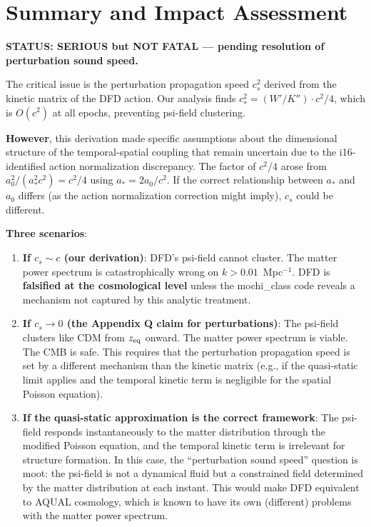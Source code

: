 \documentclass[11pt]{article}
\begin{document}
\section*{Summary and Impact Assessment}

\begin{tcolorbox}[colback=red!10!white, colframe=red!70!black,
  title=\textbf{EXISTENTIAL ASSESSMENT}]

\textbf{STATUS: SERIOUS but NOT FATAL --- pending resolution of
perturbation sound speed.}

The critical issue is the perturbation propagation speed $c_s^2$
derived from the kinetic matrix of the DFD action. Our analysis
finds $c_s^2 = (W'/K'') \cdot c^2/4$, which is $O(c^2)$ at
all epochs, preventing psi-field clustering.

\textbf{However}, this derivation made specific assumptions about the
dimensional structure of the temporal-spatial coupling that remain
uncertain due to the i16-identified action normalization discrepancy.
The factor of $c^2/4$ arose from $a_0^2/(a_*^2 c^2) = c^2/4$ using
$a_* = 2a_0/c^2$. If the correct relationship between $a_*$ and
$a_0$ differs (as the action normalization correction might imply),
$c_s$ could be different.

\textbf{Three scenarios}:
\begin{enumerate}
\item \textbf{If $c_s \sim c$ (our derivation)}: DFD's psi-field
  cannot cluster. The matter power spectrum is catastrophically
  wrong on $k > 0.01$~Mpc$^{-1}$. DFD is \textbf{falsified at the
  cosmological level} unless the mochi\_class code reveals a
  mechanism not captured by this analytic treatment.

\item \textbf{If $c_s \to 0$ (the Appendix Q claim for perturbations)}:
  The psi-field clusters like CDM from $z_{\rm eq}$ onward.
  The matter power spectrum is viable. The CMB is safe.
  This requires that the perturbation propagation speed is set
  by a different mechanism than the kinetic matrix (e.g., if the
  quasi-static limit applies and the temporal kinetic term is
  negligible for the spatial Poisson equation).

\item \textbf{If the quasi-static approximation is the correct
  framework}: The psi-field responds instantaneously to the matter
  distribution through the modified Poisson equation, and the
  temporal kinetic term is irrelevant for structure formation.
  In this case, the ``perturbation sound speed'' question is moot:
  the psi-field is not a dynamical fluid but a constrained field
  determined by the matter distribution at each instant. This
  would make DFD equivalent to AQUAL cosmology, which is known
  to have its own (different) problems with the matter power spectrum.
\end{enumerate}


\end{tcolorbox}
\end{document}
